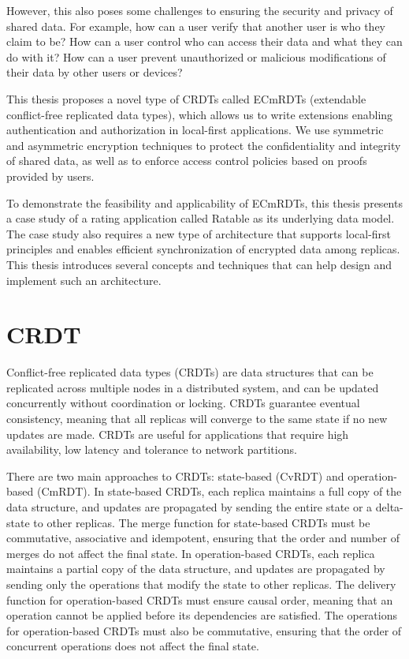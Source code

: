 \documentclass[
	ngerman,
	ruledheaders=section,   %
	class=report,		    %
	thesis={type=bachelor}, %
	accentcolor=9c,			%
	custommargins=true,    %
	marginpar=false,        %
	parskip=half-,          %
	fontsize=11pt,          %
]{tudapub}
\begin{document}
However, this also poses some challenges to ensuring the security and privacy of shared data. For example, how can a user verify that another user is who they claim to be? How can a user control who can access their data and what they can do with it? How can a user prevent unauthorized or malicious modifications of their data by other users or devices?

This thesis proposes a novel type of CRDTs called ECmRDTs (extendable conflict-free replicated data types), which allows us to write extensions enabling authentication and authorization in local-first applications. We use symmetric and asymmetric encryption techniques to protect the confidentiality and integrity of shared data, as well as to enforce access control policies based on proofs provided by users. 

To demonstrate the feasibility and applicability of ECmRDTs, this thesis presents a case study of a rating application called Ratable as its underlying data model. The case study also requires a new type of architecture that supports local-first principles and enables efficient synchronization of encrypted data among replicas. This thesis introduces several concepts and techniques that can help design and implement such an architecture.

\section{CRDT}
Conflict-free replicated data types (CRDTs) are data structures that can be replicated across multiple nodes in a distributed system, and can be updated concurrently without coordination or locking. CRDTs guarantee eventual consistency, meaning that all replicas will converge to the same state if no new updates are made. CRDTs are useful for applications that require high availability, low latency and tolerance to network partitions.

There are two main approaches to CRDTs: state-based (CvRDT) and operation-based (CmRDT). In state-based CRDTs, each replica maintains a full copy of the data structure, and updates are propagated by sending the entire state or a delta-state to other replicas. The merge function for state-based CRDTs must be commutative, associative and idempotent, ensuring that the order and number of merges do not affect the final state. In operation-based CRDTs, each replica maintains a partial copy of the data structure, and updates are propagated by sending only the operations that modify the state to other replicas. The delivery function for operation-based CRDTs must ensure causal order, meaning that an operation cannot be applied before its dependencies are satisfied. The operations for operation-based CRDTs must also be commutative, ensuring that the order of concurrent operations does not affect the final state.
\end{document}
